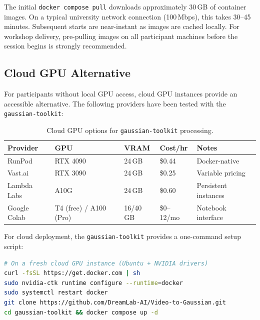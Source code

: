 \begin{technote}
The initial \texttt{docker compose pull} downloads approximately 30\,GB of container images. On a typical university network connection (100\,Mbps), this takes 30--45 minutes. Subsequent starts are near-instant as images are cached locally. For workshop delivery, pre-pulling images on all participant machines before the session begins is strongly recommended.
\end{technote}

\subsection{Cloud GPU Alternative}

For participants without local GPU access, cloud GPU instances provide an accessible alternative. The following providers have been tested with the \texttt{gaussian-toolkit}:

\begin{table}[htbp]
  \centering
  \caption{Cloud GPU options for \texttt{gaussian-toolkit} processing.}
  \label{tab:cloud-gpu}
  \begin{tabular}{@{}L{2.5cm}L{3cm}L{2.5cm}L{2cm}L{2.5cm}@{}}
    \toprule
    \textbf{Provider} & \textbf{GPU} & \textbf{VRAM} & \textbf{Cost/hr} & \textbf{Notes} \\
    \midrule
    RunPod       & RTX 4090     & 24\,GB & \$0.44 & Docker-native \\
    Vast.ai      & RTX 3090     & 24\,GB & \$0.25 & Variable pricing \\
    Lambda Labs  & A10G         & 24\,GB & \$0.60 & Persistent instances \\
    Google Colab & T4 (free) / A100 (Pro) & 16/40\,GB & \$0--12/mo & Notebook interface \\
    \bottomrule
  \end{tabular}
\end{table}

For cloud deployment, the \texttt{gaussian-toolkit} provides a one-command setup script:

\begin{lstlisting}[language=bash, caption={Cloud instance quick setup.}, label={lst:cloud-setup}]
# On a fresh cloud GPU instance (Ubuntu + NVIDIA drivers)
curl -fsSL https://get.docker.com | sh
sudo nvidia-ctk runtime configure --runtime=docker
sudo systemctl restart docker
git clone https://github.com/DreamLab-AI/Video-to-Gaussian.git
cd gaussian-toolkit && docker compose up -d
\end{lstlisting}

